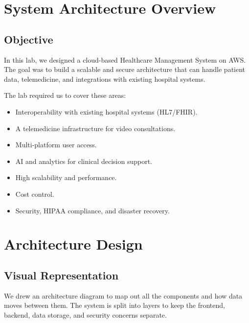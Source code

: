 \documentclass{article}
\begin{document}
\raggedbottom
\setlength{\intextsep}{6pt plus 2pt minus 2pt}
\setlength{\floatsep}{6pt plus 2pt minus 2pt}
\setlength{\textfloatsep}{6pt plus 2pt minus 2pt}

\tableofcontents
\newpage

\section{System Architecture Overview}

\subsection{Objective}

In this lab, we designed a cloud-based Healthcare Management System on AWS. The goal was to build a scalable and secure architecture that can handle patient data, telemedicine, and integrations with existing hospital systems.

The lab required us to cover these areas:
\begin{itemize}
    \item Interoperability with existing hospital systems (HL7/FHIR).
    \item A telemedicine infrastructure for video consultations.
    \item Multi-platform user access.
    \item AI and analytics for clinical decision support.
    \item High scalability and performance.
    \item Cost control.
    \item Security, HIPAA compliance, and disaster recovery.
\end{itemize}
\vspace{14cm}

\section{Architecture Design}

\subsection{Visual Representation}

We drew an architecture diagram to map out all the components and how data moves between them. The system is split into layers to keep the frontend, backend, data storage, and security concerns separate.
\end{document}
